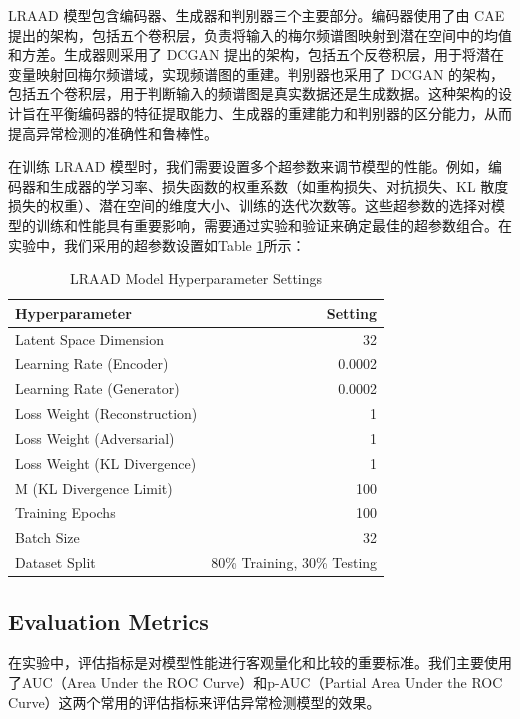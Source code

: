 \documentclass{article}
\begin{document}
LRAAD 模型包含编码器、生成器和判别器三个主要部分。编码器使用了由 CAE 提出的架构，包括五个卷积层，负责将输入的梅尔频谱图映射到潜在空间中的均值和方差。生成器则采用了 DCGAN 提出的架构，包括五个反卷积层，用于将潜在变量映射回梅尔频谱域，实现频谱图的重建。判别器也采用了 DCGAN 的架构，包括五个卷积层，用于判断输入的频谱图是真实数据还是生成数据。这种架构的设计旨在平衡编码器的特征提取能力、生成器的重建能力和判别器的区分能力，从而提高异常检测的准确性和鲁棒性。

在训练 LRAAD 模型时，我们需要设置多个超参数来调节模型的性能。例如，编码器和生成器的学习率、损失函数的权重系数（如重构损失、对抗损失、KL 散度损失的权重）、潜在空间的维度大小、训练的迭代次数等。这些超参数的选择对模型的训练和性能具有重要影响，需要通过实验和验证来确定最佳的超参数组合。在实验中，我们采用的超参数设置如Table \ref{tab:params}所示：


\begin{table}[htbp]
    \centering
    \caption{LRAAD Model Hyperparameter Settings}
    \label{tab:params}
    \begin{tabular}{lr}
        \toprule
        \textbf{Hyperparameter} & \textbf{Setting} \\
        \midrule
        Latent Space Dimension & 32 \\
        Learning Rate (Encoder) & 0.0002 \\
        Learning Rate (Generator) & 0.0002 \\
        Loss Weight (Reconstruction) & 1 \\
        Loss Weight (Adversarial) & 1 \\
        Loss Weight (KL Divergence) & 1 \\
        M (KL Divergence Limit) & 100 \\
        Training Epochs & 100 \\
        Batch Size & 32 \\
        Dataset Split & 80\% Training, 30\% Testing \\
        \bottomrule
    \end{tabular}
\end{table}


\subsection{Evaluation Metrics}
在实验中，评估指标是对模型性能进行客观量化和比较的重要标准。我们主要使用了AUC（Area Under the ROC Curve）和p-AUC（Partial Area Under the ROC Curve）这两个常用的评估指标来评估异常检测模型的效果。
\end{document}
